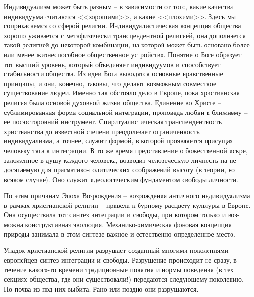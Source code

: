 \documentclass{book}
\begin{document}
Индивидуализм может быть разным -- в зависимости от то­го, какие качества индивидуума считаются <<хорошими>>, а ка­кие <<плохими>>. Здесь мы соприкасаемся со сферой религии. Индивидуалистическая концепция общества хорошо уживает­ся с метафизически трансцендентной религией, она дополняет­ся такой религией до некоторой комбинации, на которой может быть основано более или менее жизнеспособное общественное устройство. Понятие о Боге образует тот высший уровень, ко­торый объединяет индивидуумов и способствует стабильности общества. Из идеи Бога выводятся основные нравственные принципы, и они, конечно, таковы, что делают возможным совместное существование людей. Именно так обстояло дело в Европе, пока христианская религия была основой духовной жизни общества. Единение во Христе -- сублимированная форма социальной интеграции, проповедь любви к ближнему -- ее по­сюсторонний инструмент. Спиритуалистическая трансцендент­ность христианства до известной степени преодолевает ограни­ченность индивидуализма, а точнее, 
служит 
формой, в которой проявляется присущая человеку тяга к интеграции. В то же время представление о божественной искре, заложенное в ду­шу каждого человека, возводит человеческую личность на не­досягаемую для прагматико-политических соображений высоту (в теории, во всяком случае). Оно служит идеологическим фундаментом свободы личности.

По этим причинам Эпоха Возрождения -- возрождения антич­ного индивидуализма в рамках христианской религии -- при­вела к бурному расцвету культуры в Европе. Она осуществила тот синтез интеграции и свободы, при котором только и воз­можна конструктивная эволюция. Механико-химическая фоно­вая концепция природы занимала в этом синтезе важное и ес­тественно определенное место.

Упадок христианской религии разрушает созданный многи­ми поколениями европейцев синтез интеграции и свободы. Раз­рушение происходит не сразу, в течение какого-то времени традиционные понятия и нормы поведения (в тех секциях об­щества, где они существовали!) передаются следующему поколению. Но почва из-под них выбита. Рано или поздно они разру­шаются.
\end{document}
